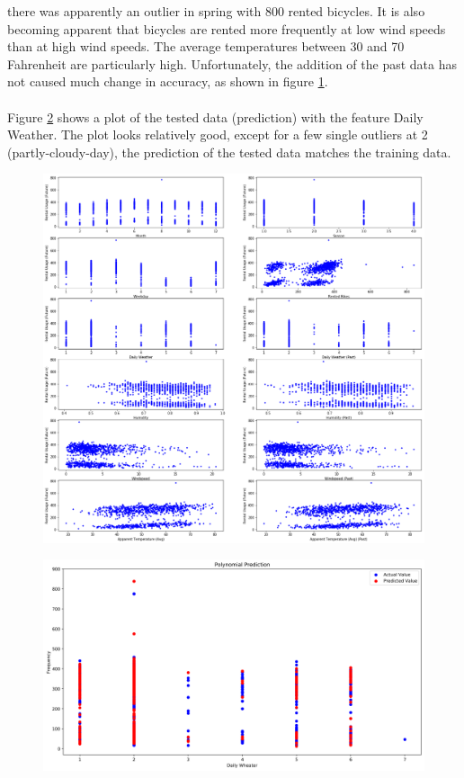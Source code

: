 there was apparently an outlier in spring with 800 rented bicycles. It is also becoming apparent
that bicycles are rented more frequently at low wind speeds than at high wind speeds. The average
temperatures between 30 and 70 Fahrenheit are particularly high. Unfortunately, the addition of
the past data has not caused much change in accuracy, as shown in figure \ref{fig:figure9_polynomial_features}.\\\\
Figure \ref{fig:figure10_polynomial_prediction} shows a plot of the tested data (prediction) with the feature \glqq Daily Weather\grqq . The plot looks relatively good, except for a few single outliers at 2 (partly-cloudy-day), the prediction of the
tested data matches the training data.
\begin{figure}[H]
\hspace{-2.8cm}
\includegraphics[width=1.4\textwidth]{img/figure9_polynomial_features}\label{fig:figure9_polynomial_features}
\label{fig:figure9_polynomial_features}
\end{figure}
\begin{figure}[H]
\hspace{-2.4cm}
\includegraphics[width=1.3\textwidth]{img/figure10_polynomial_prediction}\label{fig:figure10_polynomial_prediction}
\label{fig:figure10_polynomial_prediction}
\end{figure}
